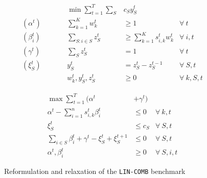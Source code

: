 \begin{figure}[ht]
\begin{mdframed}
\begin{minipage}[t]{0.5\textwidth}
	\vspace{-0.3cm}
        \begin{align*}
            && \min \sum_{t = 1}^{T} \sum_{S} & c_S y_S^t \\
            (\alpha^{t}) \qquad && \sum_{k=1}^{K} w_{k}^{t} & \geq 1  & \forall\ t \\
            (\beta_{i}^{t}) \qquad && \sum_{S: i \in S} z_{S}^{t} &\ge \sum_{k=1}^{K} s_{i,k}^{t} w_{k}^{t}   &\forall\ i,t\\
            (\gamma^{t}) \qquad && \sum_{S} z_{S}^{t} &= 1   &\forall\ t\\
            (\xi_{S}^{t}) \qquad && y_{S}^{t} &= z_{S}^{t} - z_{S}^{t-1}   &\forall\ S,t\\
            && w_{k}^{t}, y_{S}^{t}, z_{S}^{t} & \ge 0 & \forall\ k,S,t
         \end{align*}
\end{minipage}
%
\begin{minipage}[t]{0.5\textwidth}
	\vspace{-0.3cm}
        \begin{align*}
            \max \sum_{t=1}^{T}  (\alpha^{t} &+ \gamma^{t}) \\
            \alpha^{t} - \sum_{i=1}^{n} s_{i,k}^{t} \beta_{i}^{t} &\leq 0  &\forall\ k,t\\
             \xi_{S}^{t}   &\leq c_{S}  &\forall\ S,t \\
            \sum_{i \in S}\beta_{i}^{t} + \gamma^{t} - \xi_{S}^{t} + \xi_{S}^{t+1}  &\leq 0  &\forall\ S,t \\
            \alpha^{t}, \beta_{i}^{t} & \ge 0 & \forall\ S,i,t
        \end{align*}
\end{minipage}
\end{mdframed}
\caption{Reformulation and relaxation of the \texttt{LIN-COMB} benchmark}
\label{fig:reformulation}
\end{figure}

